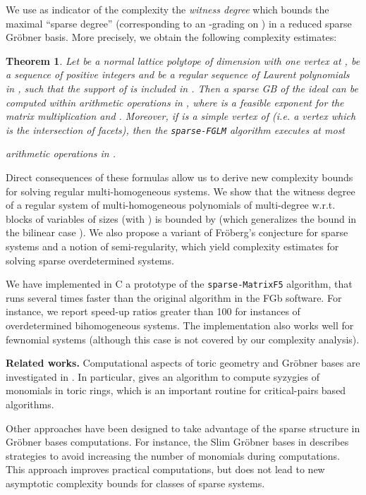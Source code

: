 \documentclass[12pt]{article}
\numberwithin{equation}{section}
\newtheorem{theorem}{Theorem}
\numberwithin{theorem}{section}
\begin{document}
We use as indicator of the complexity the \emph{witness degree} which
bounds the maximal ``sparse degree'' (corresponding to an -grading
on ) in a reduced sparse Gr\"obner
basis.  More precisely, we obtain the following complexity estimates:

\begin{theorem}\label{theo:mainres}
Let  be a normal lattice polytope of dimension
 with one vertex at ,  be a sequence of positive integers and
 be a regular sequence of Laurent polynomials in , such that the support of 
is included in . Then a sparse GB of the
ideal  can be computed
within
 arithmetic operations
in , where 
 is a feasible exponent for the matrix multiplication
and .
Moreover, if  is a simple vertex of 
(\emph{i.e.} a vertex which is the intersection of  facets), then the
{\tt sparse-FGLM} algorithm executes at most

arithmetic operations in .
\end{theorem}


Direct consequences of these formulas allow us to derive new
complexity bounds for solving regular multi-homo\-ge\-ne\-ous systems.
We show that the witness degree of a regular system of
 multi-homogeneous polynomials of multi-degree 
w.r.t. blocks of variables of sizes  (with ) is bounded by  (which generalizes the bound  in
the bilinear case \cite{faugere2011grobner}). We also propose a variant of Fr\"oberg's
conjecture for sparse systems and a notion of semi-regularity, which
yield complexity estimates for solving sparse overdetermined systems.

We have implemented in C a prototype of the {\tt sparse-MatrixF5}
algorithm, that runs several times faster than the original 
algorithm in the FGb software. For instance, we report speed-up ratios
greater than 100 for instances of overdetermined bihomogeneous
systems. The implementation also works well for fewnomial systems
(although this case is not covered by our complexity analysis).

 {\bf Related works.}  Computational aspects of toric geometry
and Gr\"obner bases are investigated in \cite{Stu96}. In particular,
\cite[Subroutine 11.18]{Stu96} gives an algorithm to compute syzygies
of monomials in toric rings, which is an important routine for critical-pairs based algorithms.

Other approaches have been designed to take advantage of the sparse
structure in Gr\"obner bases computations. For instance, the Slim Gr\"obner
bases in \cite{brickenstein2010slimgb} describes strategies to avoid
increasing the number of monomials during computations. This
approach improves practical computations, but does not lead to new
asymptotic complexity bounds for classes of sparse systems.
\end{document}
